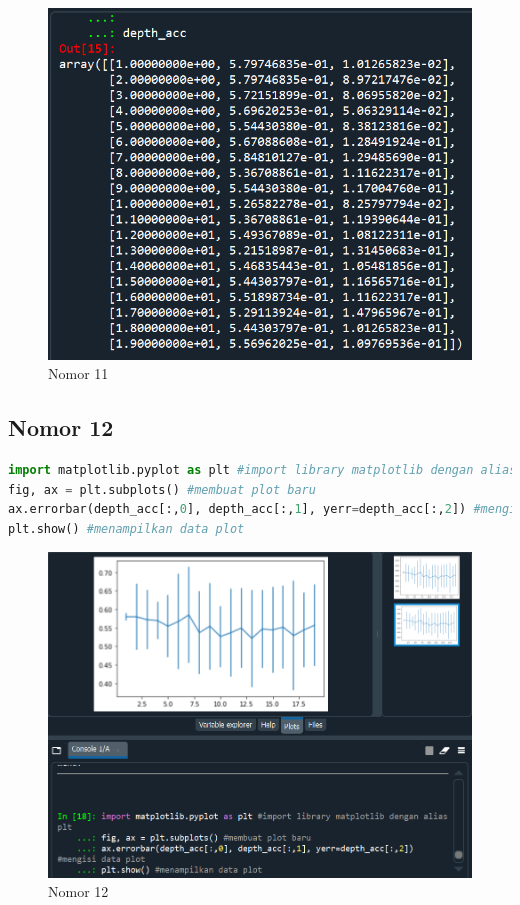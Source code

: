 \begin{figure}[H]
    \centering
    \includegraphics[width=12cm]{figures/chapter2/31.PNG}
    \caption{Nomor 11}
\end{figure}

\subsection{Nomor 12}

\begin{lstlisting}[language=Python]
import matplotlib.pyplot as plt #import library matplotlib dengan alias plt
fig, ax = plt.subplots() #membuat plot baru
ax.errorbar(depth_acc[:,0], depth_acc[:,1], yerr=depth_acc[:,2]) #mengisi data plot
plt.show() #menampilkan data plot
\end{lstlisting}

\begin{figure}[H]
    \centering
    \includegraphics[width=12cm]{figures/chapter2/32.PNG}
    \caption{Nomor 12}
\end{figure}
